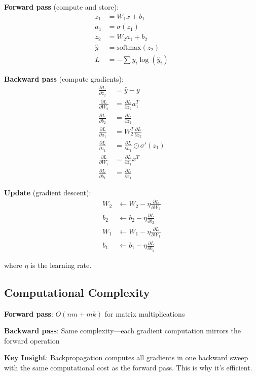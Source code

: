 \documentclass[11pt,oneside]{book}
\begin{document}
\textbf{Forward pass} (compute and store):
\begin{align*}
z_1 &= W_1 x + b_1 \\
a_1 &= \sigma(z_1) \\
z_2 &= W_2 a_1 + b_2 \\
\hat{y} &= \text{softmax}(z_2) \\
L &= -\sum y_i \log(\hat{y}_i)
\end{align*}

\textbf{Backward pass} (compute gradients):
\begin{align*}
\frac{\partial L}{\partial z_2} &= \hat{y} - y \\
\frac{\partial L}{\partial W_2} &= \frac{\partial L}{\partial z_2} a_1^T \\
\frac{\partial L}{\partial b_2} &= \frac{\partial L}{\partial z_2} \\
\frac{\partial L}{\partial a_1} &= W_2^T \frac{\partial L}{\partial z_2} \\
\frac{\partial L}{\partial z_1} &= \frac{\partial L}{\partial a_1} \odot \sigma'(z_1) \\
\frac{\partial L}{\partial W_1} &= \frac{\partial L}{\partial z_1} x^T \\
\frac{\partial L}{\partial b_1} &= \frac{\partial L}{\partial z_1}
\end{align*}

\textbf{Update} (gradient descent):
\begin{align*}
W_2 &\leftarrow W_2 - \eta \frac{\partial L}{\partial W_2} \\
b_2 &\leftarrow b_2 - \eta \frac{\partial L}{\partial b_2} \\
W_1 &\leftarrow W_1 - \eta \frac{\partial L}{\partial W_1} \\
b_1 &\leftarrow b_1 - \eta \frac{\partial L}{\partial b_1}
\end{align*}

where $\eta$ is the learning rate.

\subsection{Computational Complexity}

\textbf{Forward pass}: $O(nm + mk)$ for matrix multiplications

\textbf{Backward pass}: Same complexity---each gradient computation mirrors the forward operation

\textbf{Key Insight}: Backpropagation computes all gradients in one backward sweep with the same computational cost as the forward pass. This is why it's efficient.
\end{document}
